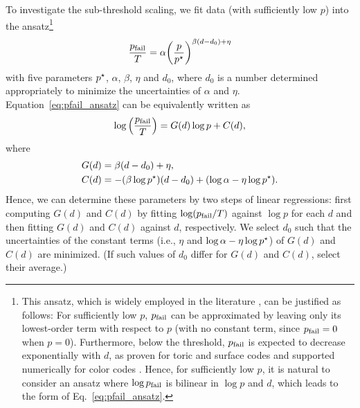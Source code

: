 \documentclass[a4paper,twocolumn,11pt,accepted=2025-01-21]{quantumarticle}
\theoremstyle{definition}
\theoremstyle{definition}
\theoremstyle{definition}
\begin{document}
To investigate the sub-threshold scaling, we fit data (with sufficiently low $p$) into the ansatz\footnote{
    This ansatz, which is widely employed in the literature \cite{fowler2013surface,fowler2013analytic,fowler2019low,litinski2019game,litinski2019magic,sahay2022decoder}, can be justified as follows:
    For sufficiently low $p$, $p_{\mathrm{fail}}$ can be approximated by leaving only its lowest-order term with respect to $p$ (with no constant term, since $p_{\mathrm{fail}} = 0$ when $p = 0$). Furthermore, below the threshold, $p_{\mathrm{fail}}$ is expected to decrease exponentially with $d$, as proven for toric and surface codes \cite{dennis2002topological,raussendorf2007topological,fowler2012proof,watson2014logical} and supported numerically for color codes \cite{beverland2021cost,sahay2022decoder}.
    Hence, for sufficiently low $p$, it is natural to consider an ansatz where $\log p_{\mathrm{fail}}$ is bilinear in $\log p$ and $d$, which leads to the form of Eq.~\eqref{eq:pfail_ansatz}.
}
\begin{align}
    \frac{p_{\mathrm{fail}}}{T} = \alpha\qty(\frac{p}{p^\star_{\mathrm{}}})^{\beta \qty(d - d_0) + \eta}
    \label{eq:pfail_ansatz}
\end{align}
with five parameters $p^\star_{\mathrm{}}$, $\alpha$, $\beta$, $\eta$ and $d_0$, where $d_0$ is a number determined appropriately to minimize the uncertainties of $\alpha$ and $\eta$.
Equation~\eqref{eq:pfail_ansatz} can be equivalently written as
\begin{align}
    \log \qty(\frac{p_{\mathrm{fail}}}{T}) = G(d) \log p + C(d), \label{eq:log_pfail_ansatz}
\end{align}
where
\begin{align*}
    G(d) &= \beta (d - d_0) + \eta, \\ 
    C(d) &= - (\beta \log p^\star_{\mathrm{}})(d - d_0) + \qty(\log \alpha - \eta \log p^\star_{\mathrm{}}).
\end{align*}
Hence, we can determine these parameters by two steps of linear regressions: first computing $G(d)$ and $C(d)$ by fitting $\log (p_{\mathrm{fail}}/T)$ against $\log p$ for each $d$ and then fitting $G(d)$ and $C(d)$ against $d$, respectively.
We select $d_0$ such that the uncertainties of the constant terms (i.e., $\eta$ and $\log\alpha - \eta\log p^\star_{\mathrm{}}$) of $G(d)$ and $C(d)$ are minimized.
(If such values of $d_0$ differ for $G(d)$ and $C(d)$, select their average.)
\end{document}
